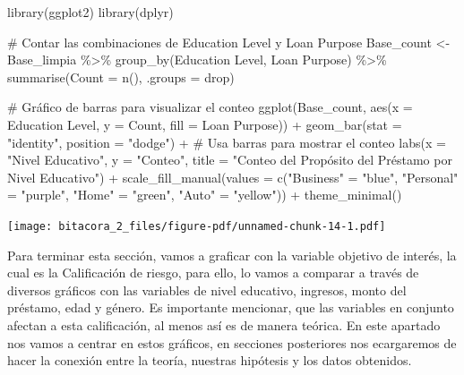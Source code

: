 \documentclass[
  letterpaper,
  DIV=11,
  numbers=noendperiod]{scrreprt}
\newenvironment{Shaded}{\begin{snugshade}}{\end{snugshade}}
\newcommand{\AttributeTok}[1]{\textcolor[rgb]{0.40,0.45,0.13}{#1}}
\newcommand{\CommentTok}[1]{\textcolor[rgb]{0.37,0.37,0.37}{#1}}
\newcommand{\FunctionTok}[1]{\textcolor[rgb]{0.28,0.35,0.67}{#1}}
\newcommand{\NormalTok}[1]{\textcolor[rgb]{0.00,0.23,0.31}{#1}}
\newcommand{\OtherTok}[1]{\textcolor[rgb]{0.00,0.23,0.31}{#1}}
\newcommand{\SpecialCharTok}[1]{\textcolor[rgb]{0.37,0.37,0.37}{#1}}
\newcommand{\StringTok}[1]{\textcolor[rgb]{0.13,0.47,0.30}{#1}}
\begin{document}
\begin{Shaded}
\begin{Highlighting}[]
\FunctionTok{library}\NormalTok{(ggplot2)}
\FunctionTok{library}\NormalTok{(dplyr)}

\CommentTok{\# Contar las combinaciones de Education Level y Loan Purpose}
\NormalTok{Base\_count }\OtherTok{\textless{}{-}}\NormalTok{ Base\_limpia }\SpecialCharTok{\%\textgreater{}\%}
  \FunctionTok{group\_by}\NormalTok{(}\StringTok{\textasciigrave{}}\AttributeTok{Education Level}\StringTok{\textasciigrave{}}\NormalTok{, }\StringTok{\textasciigrave{}}\AttributeTok{Loan Purpose}\StringTok{\textasciigrave{}}\NormalTok{) }\SpecialCharTok{\%\textgreater{}\%}
  \FunctionTok{summarise}\NormalTok{(}\AttributeTok{Count =} \FunctionTok{n}\NormalTok{(), }\AttributeTok{.groups =} \StringTok{\textquotesingle{}drop\textquotesingle{}}\NormalTok{)}

\CommentTok{\# Gráfico de barras para visualizar el conteo}
\FunctionTok{ggplot}\NormalTok{(Base\_count, }\FunctionTok{aes}\NormalTok{(}\AttributeTok{x =} \StringTok{\textasciigrave{}}\AttributeTok{Education Level}\StringTok{\textasciigrave{}}\NormalTok{, }\AttributeTok{y =}\NormalTok{ Count, }\AttributeTok{fill =} \StringTok{\textasciigrave{}}\AttributeTok{Loan Purpose}\StringTok{\textasciigrave{}}\NormalTok{)) }\SpecialCharTok{+}
  \FunctionTok{geom\_bar}\NormalTok{(}\AttributeTok{stat =} \StringTok{"identity"}\NormalTok{, }\AttributeTok{position =} \StringTok{"dodge"}\NormalTok{) }\SpecialCharTok{+}  \CommentTok{\# Usa barras para mostrar el conteo}
  \FunctionTok{labs}\NormalTok{(}\AttributeTok{x =} \StringTok{"Nivel Educativo"}\NormalTok{, }\AttributeTok{y =} \StringTok{"Conteo"}\NormalTok{, }\AttributeTok{title =} \StringTok{"Conteo del Propósito del Préstamo por Nivel Educativo"}\NormalTok{) }\SpecialCharTok{+}
  \FunctionTok{scale\_fill\_manual}\NormalTok{(}\AttributeTok{values =} \FunctionTok{c}\NormalTok{(}\StringTok{"Business"} \OtherTok{=} \StringTok{"blue"}\NormalTok{, }\StringTok{"Personal"} \OtherTok{=} \StringTok{"purple"}\NormalTok{, }\StringTok{"Home"} \OtherTok{=} \StringTok{"green"}\NormalTok{, }\StringTok{"Auto"} \OtherTok{=} \StringTok{"yellow"}\NormalTok{)) }\SpecialCharTok{+}
  \FunctionTok{theme\_minimal}\NormalTok{()}
\end{Highlighting}
\end{Shaded}

\texttt{[image: bitacora\_2\_files/figure-pdf/unnamed-chunk-14-1.pdf]}

Para terminar esta sección, vamos a graficar con la variable objetivo de
interés, la cual es la Calificación de riesgo, para ello, lo vamos a
comparar a través de diversos gráficos con las variables de nivel
educativo, ingresos, monto del préstamo, edad y género. Es importante
mencionar, que las variables en conjunto afectan a esta calificación, al
menos así es de manera teórica. En este apartado nos vamos a centrar en
estos gráficos, en secciones posteriores nos ecargaremos de hacer la
conexión entre la teoría, nuestras hipótesis y los datos obtenidos.
\end{document}
